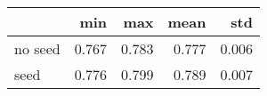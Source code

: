 \begin{tabular}{lrrrr}
\toprule
{} &    min &    max &   mean &    std \\
\midrule
no seed &  0.767 &  0.783 &  0.777 &  0.006 \\
seed    &  0.776 &  0.799 &  0.789 &  0.007 \\
\bottomrule
\end{tabular}
